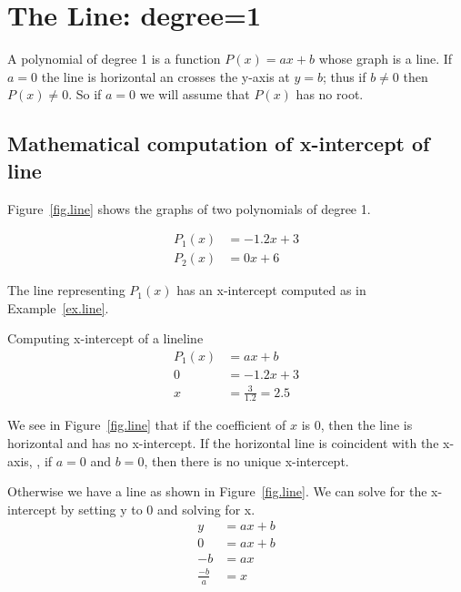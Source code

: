 \section{The Line: degree=1}
\label{sec.line}



A polynomial of degree 1 is a function $P(x)=a x + b$ whose graph is a line.   If $a=0$ the
line is horizontal an crosses the y-axis at $y=b$; thus if $b\neq 0$ then $P(x)\neq 0$.
So if $a=0$ we will assume that $P(x)$ has no root.   

\subsection{Mathematical computation of x-intercept of line}


Figure~\ref{fig.line} shows the graphs of two polynomials of degree 1.

\begin{align*}
  P_1(x) &= -1.2 x + 3\\
  P_2(x) &= 0 x + 6
\end{align*}

The line representing $P_1(x)$ has an x-intercept computed as in Example~\ref{ex.line}.


\begin{example}{Computing x-intercept of a line}{line}
  \begin{align*}
  P_1(x) &= a x + b \\
  0  &= -1.2 x + 3\\
  x &= \frac{3}{1.2} = 2.5
  \end{align*}
\end{example}

We see in Figure~\ref{fig.line} that if the coefficient of $x$ is 0, then the
line is horizontal and has no x-intercept.  If the horizontal line is coincident
with the x-axis, \ie, if $a=0$ and $b=0$, then there is no unique x-intercept.





Otherwise we have a line as shown in Figure~\ref{fig.line}.  We can
solve for the x-intercept by setting y to 0 and solving for x.
\begin{align*}
  y &= a x + b\\
  0 &= a x + b\\
  -b &= a x\\
  \frac{-b}{a} &= x
\end{align*}


